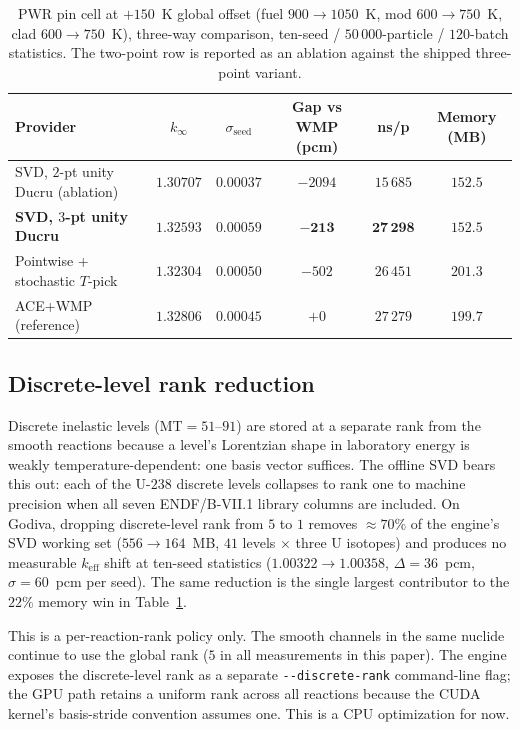 \begin{table}[t]
\centering
\caption{PWR pin cell at $+150$~K global offset
(fuel $900\to1050$~K, mod $600\to750$~K, clad $600\to750$~K),
three-way comparison, ten-seed / $50\,000$-particle /
$120$-batch statistics. The two-point row is reported as
an ablation against the shipped three-point variant.}
\label{tab:pwr_offlib}
\begin{tabular}{@{}lccccc@{}}
\toprule
Provider & $k_\infty$ & $\sigma_\text{seed}$ & Gap vs WMP (pcm)
         & ns/p & Memory (MB) \\
\midrule
SVD, $2$-pt unity Ducru (ablation) & $1.30707$ & $0.00037$ &
  $-2094$ & $15\,685$ & $152.5$ \\
\textbf{SVD, $3$-pt unity Ducru} & $\mathbf{1.32593}$ &
  $\mathbf{0.00059}$ & $\mathbf{-213}$ &
  $\mathbf{27\,298}$ & $\mathbf{152.5}$ \\
Pointwise + stochastic $T$-pick & $1.32304$ & $0.00050$ &
  $-502$ & $26\,451$ & $201.3$ \\
ACE+WMP (reference)              & $1.32806$ & $0.00045$ &
  $+0$   & $27\,279$ & $199.7$ \\
\bottomrule
\end{tabular}
\end{table}

\subsection{Discrete-level rank reduction}
\label{sec:discrete_rank}

Discrete inelastic levels (MT$=51$--$91$) are stored at a
separate rank from the smooth reactions because a level's
Lorentzian shape in laboratory energy is weakly
temperature-dependent: one basis vector suffices.
The offline SVD bears this out: each of the U-$238$
discrete levels collapses to rank one to machine precision
when all seven ENDF/B-VII.1 library columns are included.
On Godiva, dropping discrete-level rank from $5$ to $1$
removes $\approx\!70\%$ of the engine's SVD working set
($556 \to 164$~MB, $41$ levels $\times$ three U isotopes)
and produces no measurable $k_\text{eff}$ shift at
ten-seed statistics ($1.00322 \to 1.00358$,
$\Delta = 36$~pcm, $\sigma = 60$~pcm per seed). The same
reduction is the single largest contributor to the
$22\%$ memory win in Table~\ref{tab:pwr_offlib}.

This is a per-reaction-rank policy only. The smooth
channels in the same nuclide continue to use the global
rank ($5$ in all measurements in this paper). The engine
exposes the discrete-level rank as a separate
\texttt{-{}-discrete-rank} command-line flag; the GPU path
retains a uniform rank across all reactions because the
CUDA kernel's basis-stride convention assumes one. This is
a CPU optimization for now.

